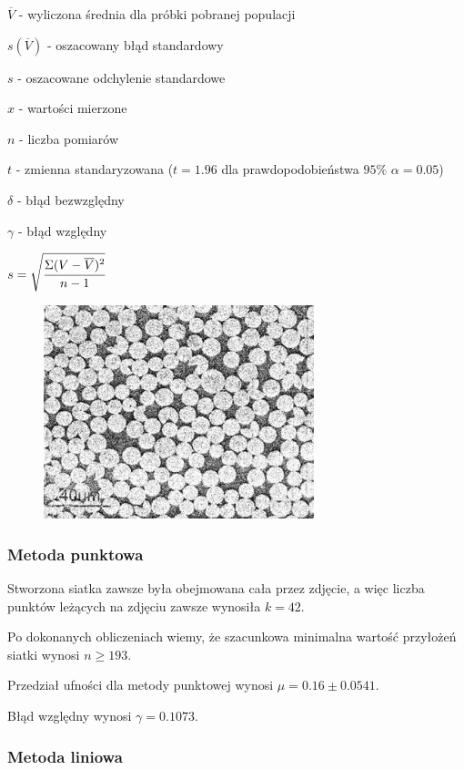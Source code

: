 \documentclass[a4paper,12pt]{article}
\begin{document}
$\overline{V}$ - wyliczona średnia dla próbki pobranej populacji

$s(\overline{V})$ - oszacowany błąd standardowy

$s$ - oszacowane odchylenie standardowe

$x$ - wartości mierzone 

$n$ - liczba pomiarów

$t$ - zmienna standaryzowana ($t=1.96$ dla prawdopodobieństwa $95\%$ $\alpha=0.05$)

$\delta$ - błąd bezwzględny

$\gamma$ - błąd względny

$s=\sqrt{\cfrac{\Sigma (V-\overline{V})^2}{n-1}}$

\begin{figure}[H]
    \centering
    \includegraphics[width=0.7\textwidth]{img/VV.png}
\end{figure}

\newpage

\subsubsection{Metoda punktowa}

{\color{purple}
Stworzona siatka zawsze była obejmowana cała przez zdjęcie, a więc liczba punktów leżących na zdjęciu zawsze wynosiła $k=42$. }

Po dokonanych obliczeniach wiemy, że szacunkowa minimalna wartość przyłożeń siatki wynosi $n\ge 193$.



Przedział ufności dla metody punktowej wynosi $\mu=0.16\pm 0.0541$.

Błąd względny wynosi $\gamma=0.1073$.
\newpage

\subsubsection{Metoda liniowa}
\end{document}
